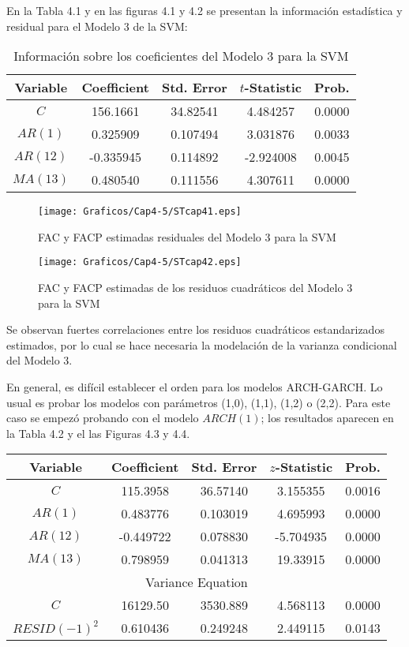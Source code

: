 En la Tabla 4.1 y en las figuras 4.1 y 4.2 se presentan la informaci\'{o}n estad\'{i}stica y residual para el Modelo 3 de la SVM:

\begin{table}[H]
\centering
\begin{tabular}{ccccc}\hline\hline
Variable & Coefficient & Std. Error & $t$-Statistic & Prob. \\ \hline\hline
$C$& 156.1661& 34.82541& 4.484257& 0.0000 \\
$AR(1)$& 0.325909& 0.107494& 3.031876& 0.0033 \\
$AR(12)$& -0.335945& 0.114892& -2.924008& 0.0045 \\
$MA(13)$& 0.480540& 0.111556& 4.307611& 0.0000 \\ \hline\hline
\end{tabular}
\caption{Informaci\'{o}n sobre los coeficientes del Modelo 3 para la SVM}
\end{table}

\begin{figure}[H]
\centering
\texttt{[image: Graficos/Cap4-5/STcap41.eps]}
\caption{FAC y FACP estimadas residuales del Modelo 3 para la SVM}
\end{figure}

\begin{figure}[H]
\centering
\texttt{[image: Graficos/Cap4-5/STcap42.eps]}
\caption{FAC y FACP estimadas de los residuos cuadr\'{a}ticos del Modelo 
3 para la SVM}
\end{figure}

Se observan fuertes correlaciones entre los residuos cuadr\'{a}ticos estandarizados estimados, por lo cual se hace necesaria la modelaci\'{o}n de la varianza condicional del Modelo 3.\newline

En general, es dif\'{i}cil establecer el orden para los modelos ARCH-GARCH. Lo usual es probar los modelos con par\'{a}metros (1,0), (1,1), (1,2) o (2,2). Para este caso se empez\'{o} probando con el modelo $ARCH(1)$; los resultados aparecen en la Tabla 4.2 y el las Figuras 4.3 y 4.4. 

\begin{table}[H]
\centering
\begin{tabular}{ccccc}\hline\hline
Variable & Coefficient & Std. Error & $z$-Statistic & Prob. \\ \hline\hline
$C$& 115.3958& 36.57140& 3.155355& 0.0016 \\
$AR(1)$& 0.483776& 0.103019& 4.695993& 0.0000 \\
$AR(12)$& -0.449722& 0.078830& -5.704935& 0.0000 \\
$MA(13)$& 0.798959& 0.041313& 19.33915& 0.0000 \\ \hline\hline
\multicolumn{5}{c}{Variance Equation}\\ \hline\hline
$C$& 16129.50& 3530.889& 4.568113& 0.0000 \\
$RESID(-1)^2$& 0.610436& 0.249248& 2.449115& 0.0143 \\ \hline\hline
\end{tabular}
\end{table}

